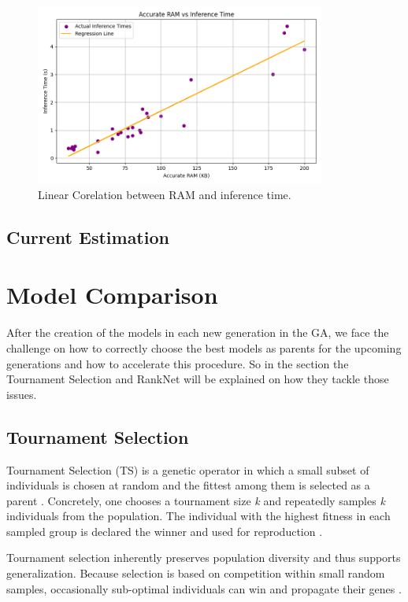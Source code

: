 \begin{figure}[ht]
  \centering
  \includegraphics[width=0.85\textwidth]{Pictures/inference_time_regression_plot.png}
  \caption{Linear Corelation between RAM and inference time.}
  \label{fig:inference time}
\end{figure}


\subsection{Current Estimation}



\section{Model Comparison}
After the creation of the models in each new generation in the GA, we face the challenge on how to correctly choose the best models as parents for the upcoming generations and how to accelerate this procedure. So in the section the Tournament Selection and RankNet will be explained on how they tackle those issues. 

\subsection{Tournament Selection}
Tournament Selection (TS) is a genetic operator in which a small subset of individuals is chosen at random and the fittest among them is selected as a parent \cite{hussain2020trade}. 
Concretely, one chooses a tournament size \textit{k} and repeatedly samples \textit{k} individuals from the population. The individual with the highest fitness in each sampled group is declared the winner and used for reproduction \cite{hussain2020trade}.

Tournament selection inherently preserves population diversity and thus supports generalization. Because selection is based on competition within small random samples, occasionally sub-optimal individuals can win and propagate their genes \cite{hussain2020trade}.


